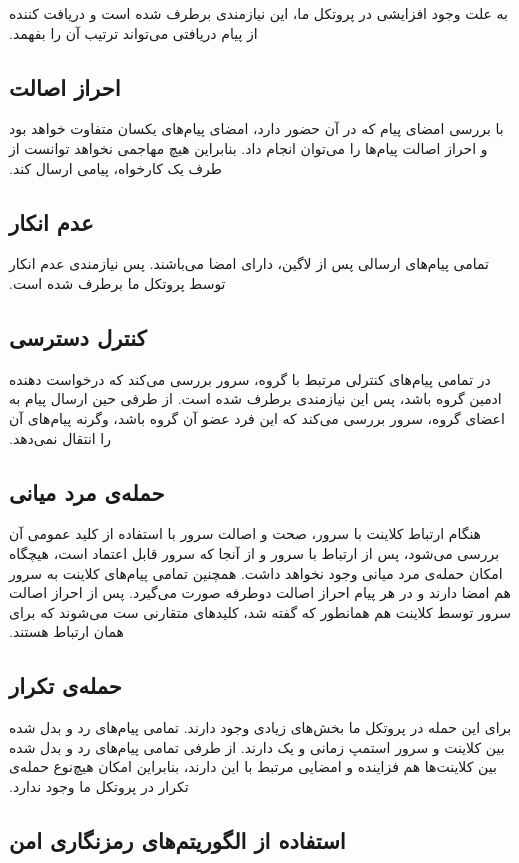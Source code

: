 ‫به علت وجود  افزایشی در پروتکل ما، این نیازمندی برطرف شده است و دریافت کننده از  پیام دریافتی می‌تواند ترتیب آن را بفهمد.
‫
‫\subsection{احراز اصالت}
‫با بررسی امضای پیام که در آن  حضور دارد، امضای پیام‌های یکسان متفاوت خواهد بود و احراز اصالت پیام‌ها را می‌توان انجام داد. بنابراین هیچ مهاجمی نخواهد توانست از طرف یک کارخواه، پیامی ارسال کند.
‫
‫\subsection{عدم انکار}
‫تمامی پیام‌های ارسالی پس از لاگین، دارای امضا می‌باشند. پس نیازمندی عدم انکار توسط پروتکل ما برطرف شده است.
‫
‫\subsection{کنترل دسترسی}
‫در تمامی پیام‌های کنترلی مرتبط با گروه، سرور بررسی می‌کند که درخواست دهنده ادمین گروه باشد، پس این نیازمندی برطرف شده است. از طرفی حین ارسال پیام به اعضای گروه، سرور بررسی می‌کند که این فرد عضو آن گروه باشد، وگرنه پیام‌های آن را انتقال نمی‌دهد.
‫
‫\subsection{حمله‌ی مرد میانی}
‫هنگام ارتباط کلاینت با سرور، صحت و اصالت سرور با استفاده از کلید عمومی آن بررسی می‌شود، پس از ارتباط با سرور و از آنجا که سرور قابل اعتماد است، هیچگاه امکان حمله‌ی مرد میانی وجود نخواهد داشت. همچنین تمامی پیام‌های کلاینت به سرور هم امضا دارند و در هر پیام احراز اصالت دوطرفه صورت می‌گیرد. پس از احراز اصالت سرور توسط کلاینت هم همانطور که گفته شد، کلیدهای متقارنی ست می‌شوند که برای همان ارتباط هستند.
‫
‫\subsection{حمله‌ی تکرار}
‫برای این حمله در پروتکل ما بخش‌های زیادی وجود دارند. تمامی پیام‌های رد و بدل شده بین کلاینت و سرور استمپ زمانی و یک  دارند. از طرفی تمامی پیام‌های رد و بدل شده بین کلاینت‌ها هم  فزاینده و امضایی مرتبط با این  دارند، بنابراین امکان هیچ‌نوع حمله‌ی تکرار در پروتکل ما وجود ندارد.
‫
‫\subsection{استفاده از الگوریتم‌های رمزنگاری امن}
